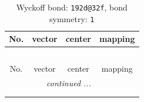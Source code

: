 \documentclass[fleqn,8pt]{jsarticle}
\begin{document}
\renewcommand{\arraystretch}{1.2}
\begin{longtable}{cccc}
\caption{Wyckoff bond: {\tt 192d@32f}, bond symmetry: {\tt 1}}
 \\
 \hline \hline
No. & vector & center & mapping \\ \hline \endfirsthead

\multicolumn{3}{l}{\tablename\ \thetable{}} \\
 \hline \hline
No. & vector & center & mapping \\ \hline \endhead

 \hline \hline
\multicolumn{3}{r}{\footnotesize\it continued ...} \\ \endfoot

 \hline \hline
\multicolumn{3}{r}{} \\ \endlastfoot


\end{longtable}
\end{document}
